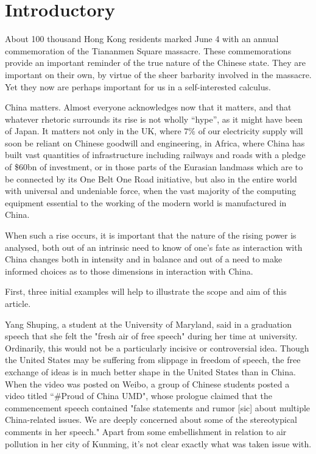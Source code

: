 \documentclass[10pt,a4paper,twocolumn]{article}
\begin{document}
\section{Introductory}

About 100 thousand Hong Kong residents marked June 4 with an annual commemoration of the Tiananmen Square massacre. These commemorations provide an important reminder of the true nature of the Chinese state. They are important on their own, by virtue of the sheer barbarity involved in the massacre. Yet they now are perhaps important for us in a self-interested calculus.

China matters. Almost everyone acknowledges now that it matters, and that whatever rhetoric surrounds its rise is not wholly ``hype'', as it might have been of Japan. It matters not only in the UK, where $7\%$ of our electricity supply will soon be reliant on Chinese goodwill and engineering\cite{hinkley}, in Africa, where China has built vast quantities of infrastructure including railways and roads with a pledge of \$60bn of investment\cite{ifrica}, or in those parts of the Eurasian landmass which are to be connected by its One Belt One Road initiative, but also in the entire world with universal and undeniable force, when the vast majority of the computing equipment essential to the working of the modern world is manufactured in China.

When such a rise occurs, it is important that the nature of the rising power is analysed, both out of an intrinsic need to know of one's fate as interaction with China changes both in intensity and in balance and out of a need to make informed choices as to those dimensions in interaction with China.

First, three initial examples will help to illustrate the scope and aim of this article.

Yang Shuping, a student at the University of Maryland, said in a graduation speech that she felt the "fresh air of free speech" during her time at university\cite{yang}. Ordinarily, this would not be a particularly incisive or controversial idea. Though the United States may be suffering from slippage in freedom of speech, the free exchange of ideas is in much better shape in the United States than in China\cite{press}\cite{freedomhouse}. When the video was posted on Weibo, a group of Chinese students posted a video titled ``\#Proud of China UMD", whose prologue claimed that the commencement speech contained "false statements and rumor [sic] about multiple China-related issues. We are deeply concerned about some of the stereotypical comments in her speech."\cite{umd} Apart from some embellishment in relation to air pollution in her city of Kunming, it's not clear exactly what was taken issue with.
\end{document}
